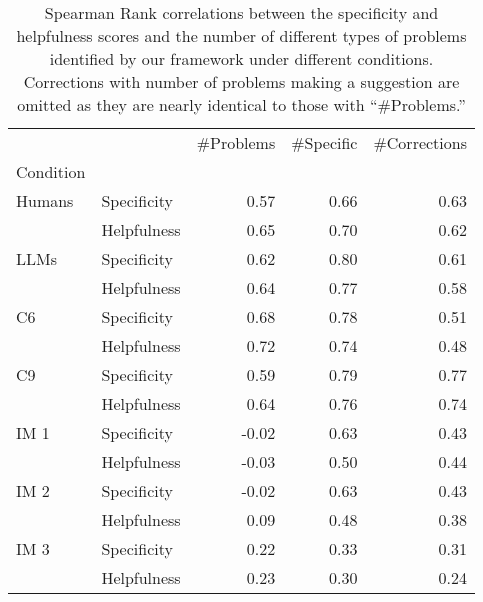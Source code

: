 \begin{table}[]
    \centering
    \scriptsize

\begin{tabular}{llrrr}
\toprule
        &             &  \#Problems &  \#Specific &  \#Corrections \\
Condition &  &            &                 &               \\
\midrule
Humans & Specificity &       0.57 &            0.66 &          0.63 \\
        & Helpfulness      &       0.65 &            0.70 &          0.62 \\
LLMs & Specificity      &       0.62 &            0.80 &          0.61 \\
        & Helpfulness      &       0.64 &            0.77 &          0.58 \\ \midrule
        
C6 & Specificity &       0.68 &            0.78 &          0.51 \\
        & Helpfulness &       0.72 &            0.74 &          0.48 \\

C9 & Specificity &       0.59 &            0.79 &          0.77 \\
        & Helpfulness &       0.64 &            0.76 &          0.74 \\ \midrule

IM 1 & Specificity &       -0.02 &            0.63 &          0.43 \\
        & Helpfulness &      -0.03 &            0.50 &          0.44 \\

IM 2 & Specificity &       -0.02 &            0.63 &          0.43 \\
        & Helpfulness &     0.09 &            0.48 &          0.38 \\

IM 3 & Specificity &     0.22 &            0.33 &          0.31 \\
        & Helpfulness &     0.23 &            0.30 &          0.24 \\

\bottomrule
\end{tabular}

    \caption{Spearman Rank correlations between the specificity and helpfulness scores and the number of different types of problems identified by our framework under different conditions. Corrections with number of problems making a suggestion are omitted as they are nearly identical to those with ``\#Problems.''}
    \label{tab:specificityHelpfulnessCorr}
\end{table}


